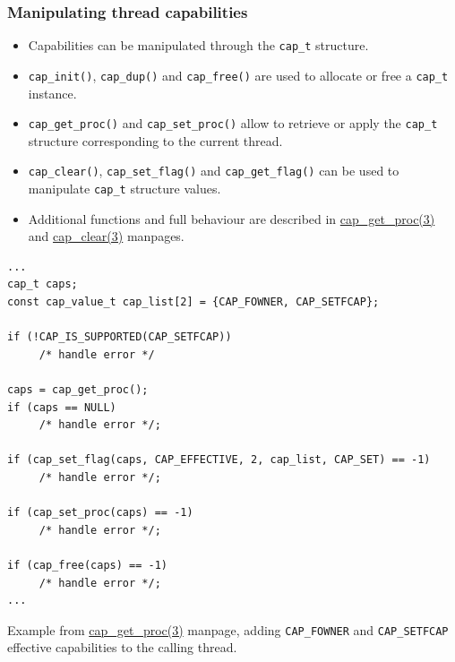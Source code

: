 \begin{frame}
	\frametitle{Manipulating thread capabilities}
	\begin{itemize}
		\item Capabilities can be manipulated through the \texttt{cap\_t} structure.
		\item \texttt{cap\_init()}, \texttt{cap\_dup()} and \texttt{cap\_free()} are
			used to allocate or free a \texttt{cap\_t} instance.
		\item \texttt{cap\_get\_proc()} and \texttt{cap\_set\_proc()} allow to
			retrieve or apply the \texttt{cap\_t} structure corresponding to the
			current thread.
		\item \texttt{cap\_clear()}, \texttt{cap\_set\_flag()} and
			\texttt{cap\_get\_flag()} can be used to manipulate \texttt{cap\_t}
			structure values.
		\item Additional functions and full behaviour are described in
			\href{https://manned.org/cap_get_proc.3}{cap\_get\_proc(3)} and
			\href{https://manned.org/cap_clear.3}{cap\_clear(3)} manpages.
	\end{itemize}
	\begin{block}{}
		{\tiny
    \begin{verbatim}
...
cap_t caps;
const cap_value_t cap_list[2] = {CAP_FOWNER, CAP_SETFCAP};

if (!CAP_IS_SUPPORTED(CAP_SETFCAP))
     /* handle error */

caps = cap_get_proc();
if (caps == NULL)
     /* handle error */;

if (cap_set_flag(caps, CAP_EFFECTIVE, 2, cap_list, CAP_SET) == -1)
     /* handle error */;

if (cap_set_proc(caps) == -1)
     /* handle error */;

if (cap_free(caps) == -1)
     /* handle error */;
...
\end{verbatim}
}
	\end{block}
	\begin{center}
		Example from \href{https://manned.org/cap_get_proc.3}{cap\_get\_proc(3)}
		manpage, adding \texttt{CAP\_FOWNER} and \texttt{CAP\_SETFCAP} effective
		capabilities to the calling thread.
	\end{center}
\end{frame}

